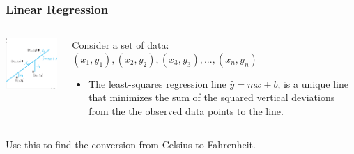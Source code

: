 \documentclass{beamer}
\begin{document}
\begin{frame}\frametitle{Linear Regression}
\begin{columns}
\begin{column}{6cm}
\begin{center}
\includegraphics[width=5cm]{fig/lsqr.png}
\end{center}
\end{column}

\begin{column}{5cm}
Consider a set of data: $(x_1,y_1),(x_2,y_2),(x_3,y_3),...,(x_n,y_n)$
\begin{itemize}
\item The least-squares regression line $\hat{y} = mx + b$, is a unique line that minimizes the sum of the squared vertical deviations from the the observed data points to the line.
\end{itemize}
\end{column}
\end{columns}

\vspace{1cm}

Use this to find the conversion from Celsius to Fahrenheit.
\end{frame}
\end{document}
